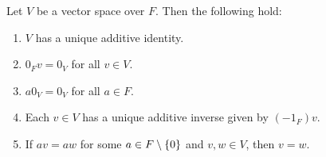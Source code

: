 
\begin{prop} \label{prop:vector:properties}
    Let $V$ be a vector space over $F$. Then the following hold:
    \begin{enumerate}[label=(\alph*)]
        \item $V$ has a unique additive identity.
        \item $0_{F} v = 0_{V}$ for all $v \in V$.
        \item $a 0_{V} = 0_{V}$ for all $a \in F$.
        \item Each $v \in V$ has a unique additive inverse given by $(-1_{F}) v$.
        \item If $a v = a w$ for some $a \in F \setminus\set{0}$ and $v, w \in V$, then $v = w$.
    \end{enumerate}
\end{prop}

